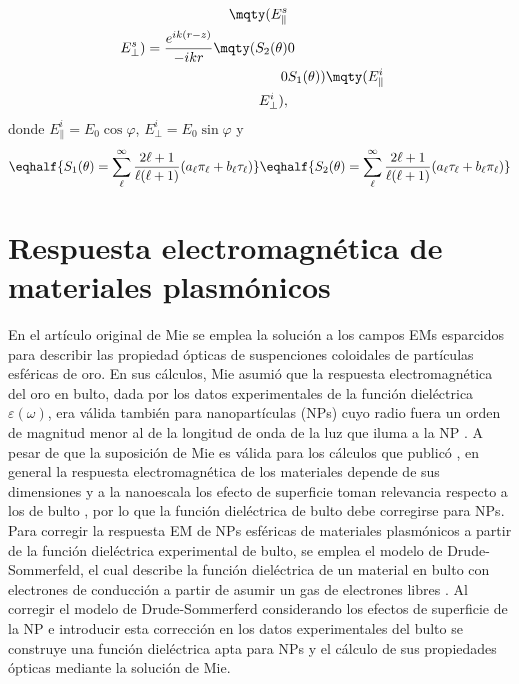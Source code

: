 	\begin{tcolorbox}[title = Matriz de esparcimiento de Mie,  breakable ]
	\begin{align}
	\mqty(E_{\parallel}^s\\E_{\perp}^s)  =  
		\frac{e^{ik(r-z)}}{-ikr} \mqty(S_2 (\theta) & 0\\ 0 & S_1 (\theta))
	\mqty(E_{\parallel}^i\\E_{\perp}^i),	
	\label{eq:MieMatrix}
	\end{align}
	donde $E^i_\parallel=E_0\cos\varphi$, $E^i_\perp = E_0\sin\varphi$ y \begin{subequations}\\
	\eqhalf{	S_1 (\theta) = \sum_\ell^\infty\frac{2\ell+1}{\ell(\ell+1)}(a_\ell\pi_\ell+b_\ell\tau_\ell)
				\label{eqs:S_1}}
	\eqhalf{	S_2 (\theta) = \sum_\ell^\infty\frac{2\ell+1}{\ell(\ell+1)}( a_\ell \tau_\ell + b_\ell\pi_\ell )
			 \label{eqs:S_2}	}
	\label{eq:MatrixElements}	\end{subequations}
	\end{tcolorbox}\vspace*{-.75em}\noindent

\section{Respuesta electromagnética de materiales plasmónicos}

En el artículo original de Mie \cite{mie1908metallosung} se emplea la solución a los campos EMs esparcidos para describir las propiedad ópticas de suspenciones coloidales de partículas esféricas de oro. En sus cálculos, Mie asumió que la  respuesta electromagnética del oro en bulto, dada por los datos experimentales de la función dieléctrica $\varepsilon(\omega)$, era válida también para nanopartículas (NPs) cuyo radio fuera un orden de magnitud menor al de la longitud de onda de la luz que iluma a la NP \cite{horvath2009historic}. A pesar de que la suposición de Mie es válida para los cálculos que publicó \cite{horvath2009historic}, en general la respuesta electromagnética de los materiales depende de sus dimensiones y a la nanoescala los efecto de superficie toman relevancia respecto a los de bulto \cite{boverhof2015comparative}, por lo que la función dieléctrica de bulto debe corregirse para NPs. Para corregir la respuesta EM de NPs esféricas de materiales plasmónicos a partir de la función dieléctrica experimental de bulto, se emplea el modelo de Drude-Sommerfeld, el cual describe la función dieléctrica de un material en bulto con electrones de conducción a partir de asumir un gas de electrones libres \cite{gross2014festkorperphysik}. Al corregir el modelo de Drude-Sommerferd considerando los efectos de superficie de la NP e introducir esta corrección en los datos experimentales del bulto se construye una función dieléctrica apta para NPs y el cálculo de sus propiedades ópticas mediante la solución de Mie.

